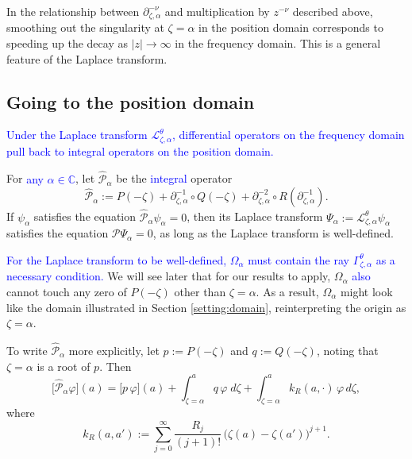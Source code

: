 \documentclass[review]{siamart220329}
\newcommand{\C}{\mathbb{C}}
\newcommand{\laplace}{\mathcal{L}}
\newcommand{\fracderiv}[3]{\partial^{#1}_{#2, #3}}
\newcommand{\domain}{\Omega}
\begin{document}
\begin{rmk}
In the relationship between $\fracderiv{-\nu}{\zeta}{\alpha}$ and multiplication by $z^{-\nu}$ described above, smoothing out the singularity at $\zeta = \alpha$ in the position domain corresponds to speeding up the decay as $|z| \to \infty$ in the frequency domain. This is a general feature of the Laplace transform.
\end{rmk}
\subsection{Going to the position domain}
\textcolor{blue}{Under the Laplace transform $\laplace_{\zeta,\alpha}^{\theta}$, differential operators on the frequency domain pull back to integral operators on the position domain.}
\begin{lemma}\label{lem:use-dict}
For \textcolor{blue}{any $\alpha \in \C$}, let $\hat{\mathcal{P}}_{\alpha}$ be the \textcolor{blue}{integral} operator 
\[ \hat{\mathcal{P}}_\alpha:=P(-\zeta)+\partial_{\zeta,\alpha}^{-1}\circ Q(-\zeta)+\partial_{\zeta,\alpha}^{-2}\circ R(\partial_{\zeta,\alpha}^{-1}). \]
If $\psi_\alpha$ satisfies the equation $\hat{\mathcal{P}}_\alpha\psi_\alpha=0$, then its Laplace transform $\Psi_\alpha:=\laplace_{\zeta,\alpha}^{\theta}\psi_\alpha$ satisfies the equation $\mathcal{P}\Psi_\alpha=0$, as long as the Laplace transform is well-defined.
\end{lemma}
\begin{rmk}
\textcolor{blue}{For the Laplace transform to be well-defined, $\domain_\alpha$ must contain the ray $\Gamma_{\zeta, \alpha}^\theta$ as a necessary condition.} We will see later that for our results to apply, $\domain_\alpha$ \textcolor{blue}{also} cannot touch any zero of $P(-\zeta)$ other than $\zeta = \alpha$. As a result, $\domain_\alpha$ might look like the domain illustrated in Section \ref{setting:domain}, reinterpreting the origin as $\zeta = \alpha$. 
\end{rmk}
\color{blue}\begin{rmk}\label{rmk:use-dict-explicit}
To write $\hat{\mathcal{P}}_\alpha$ more explicitly, let $p := P(-\zeta)$ and $q := Q(-\zeta)$, noting that $\zeta = \alpha$ is a root of $p$. Then
\[ \big[\hat{\mathcal{P}}_\alpha\varphi\big](a) = \big[ p\, \varphi \big](a) + \int_{\zeta=\alpha}^a q \, \varphi \; d\zeta + \int_{\zeta=\alpha}^a k_R(a,\cdot) \, \varphi \, d\zeta, \]
where
\[ k_R(a,a') := \sum_{j=0}^\infty \frac{R_{j}}{(j+1)!} \, \big(\zeta(a)-\zeta(a')\big)^{j+1} . \]
\end{rmk}\color{black}
\end{document}
